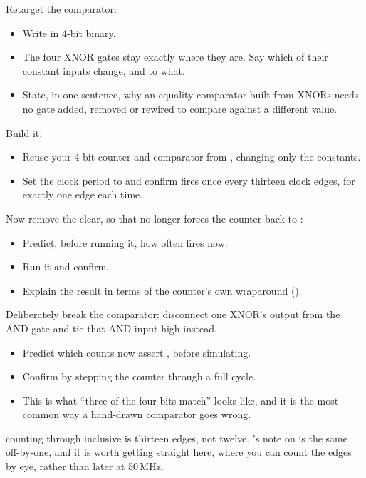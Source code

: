\begin{parts}
  \item Retarget the comparator:
    \begin{itemize}
      \item Write  in 4-bit binary.
      \item The four XNOR gates stay exactly where they are. Say which of their constant inputs
        change, and to what.
      \item State, in one sentence, why an equality comparator built from XNORs needs no gate
        added, removed or rewired to compare against a different value.
    \end{itemize}
  \item Build it:
    \begin{itemize}
      \item Reuse your 4-bit counter and comparator from , changing only the
        constants.
      \item Set the clock period to  and confirm  fires once every
        thirteen clock edges, for exactly one edge each time.
    \end{itemize}
  \item Now remove the clear, so that  no longer forces the counter back to
    :
    \begin{itemize}
      \item Predict, before running it, how often  fires now.
      \item Run it and confirm.
      \item Explain the result in terms of the counter's own wraparound ().
    \end{itemize}
  \item Deliberately break the comparator: disconnect one XNOR's output from the AND gate and tie
    that AND input high instead.
    \begin{itemize}
      \item Predict which counts now assert , before simulating.
      \item Confirm by stepping the counter through a full cycle.
      \item This is what ``three of the four bits match'' looks like, and it is the most common way
        a hand-drawn comparator goes wrong.
    \end{itemize}
\end{parts}
\note[Tip] counting  through  inclusive is thirteen edges, not twelve.
's note on  is the same off-by-one, and it is worth getting
straight here, where you can count the edges by eye, rather than later at 50\,MHz.

